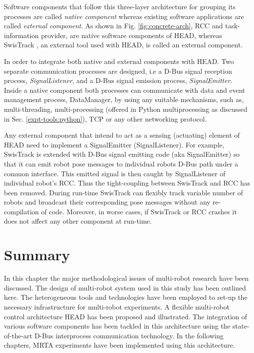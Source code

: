 Software components that follow this three-layer architecture for grouping its processes are called {\em native component} whereas existing software applications are called {\em external component}. As shown in Fig. \ref{fig:concrete-arch}, RCC and task-information provider,   are native software components of HEAD, whereas SwisTrack \cite{Lochmatter+2008}, an external tool used with HEAD, is called an external component.

In order to integrate both native and external components with HEAD. Two separate communication processes are designed, i.e a D-Bus signal reception process, {\em SignalListener}, and a D-Bus signal emission process, {\em SignalEmitter}. Inside a native component both processes can communicate with data and event management process, DataManager, by using any suitable mechanisms, such as, multi-threading, multi-processing (offered in Python multiprocessing as discussed in Sec. \ref{expt-tools:python}), TCP or any other networking protocol.

Any external component that intend to act as a sensing (actuating) element of HEAD need to implement a SignalEmitter (SignalListener). For example,  SwisTrack is extended with D-Bus signal emitting code (aka SignalEmitter) so that it can emit robot pose messages to individual robots D-Bus path under a common interface.  This emitted signal is then caught by SignalListener of individual robot's RCC. Thus the tight-coupling between SwisTrack and RCC has been removed. During run-time SwisTrack can flexibly track variable number of robots and broadcast their corresponding pose messages without any re-compilation of code. Moreover, in worse cases, if SwisTrack or RCC crashes it does not affect any other component at run-time.
\section{Summary}
In this chapter the major methodological issues of multi-robot research have been discussed. The design of multi-robot system used in this study has been outlined here. The heterogeneous tools and technologies have been employed to set-up the necessary infrastructure for multi-robot experiments. A flexible multi-robot control architecture HEAD has been proposed and illustrated. The integration of various software components has been tackled in this architecture using the state-of-the-art D-Bus interprocess communication technology. In the following chapters, MRTA experiments have been implemented using this architecture. 
